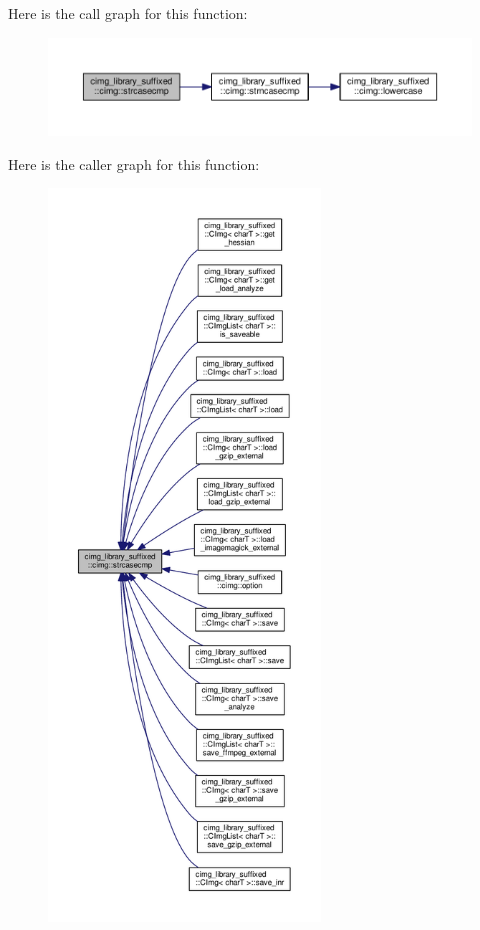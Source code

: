 Here is the call graph for this function\+:
\nopagebreak
\begin{figure}[H]
\begin{center}
\leavevmode
\includegraphics[width=350pt]{d4/d9b/namespacecimg__library__suffixed_1_1cimg_a1c34609cc6fef6f5fe5ffb2f69ad7989_cgraph}
\end{center}
\end{figure}
Here is the caller graph for this function\+:
\nopagebreak
\begin{figure}[H]
\begin{center}
\leavevmode
\includegraphics[height=550pt]{d4/d9b/namespacecimg__library__suffixed_1_1cimg_a1c34609cc6fef6f5fe5ffb2f69ad7989_icgraph}
\end{center}
\end{figure}
\mbox{\label{namespacecimg__library__suffixed_1_1cimg_a69a3a1bbdf0f62474211ea5a398f9e72}} 
